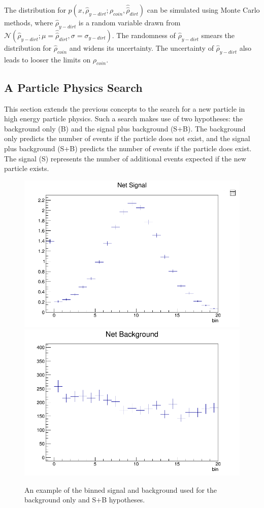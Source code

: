 \documentclass[12pt]{article}
\begin{document}
The distribution for $p(x, \hat{\rho}_{y-dirt}; \rho_{coin}, \hat{\hat{\rho}}_{dirt})$ can be simulated using Monte Carlo methods, where $\hat{\rho}_{y-dirt}$ is a random variable drawn from $\mathcal{N}(\hat{\rho}_{y-dirt}; \mu=\hat{\hat{\rho}}_{dirt}, \sigma=\sigma_{y-dirt})$. The randomness of $\hat{\rho}_{y-dirt}$ smears the distribution for $\hat{\rho}_{coin}$ and widens its uncertainty. The uncertainty of $\hat{\rho}_{y-dirt}$ also leads to looser the limits on $\rho_{coin}$.

\subsection{A Particle Physics Search}

This section extends the previous concepts to the search for a new particle in high energy particle physics. Such a search makes use of two hypotheses: the background only (B) and the signal plus background (S+B). The background only predicts the number of events if the particle does not exist, and the signal plus background (S+B) predicts the number of events if the particle does exist. The signal (S) represents the number of additional events expected if the new particle exists.

\begin{figure}[h!]
  \centering
  \includegraphics[width=0.49\linewidth]{images/binning_signal_example.png}
  \includegraphics[width=0.49\linewidth]{images/binning_bg_example.png}
  \caption[An example of the signal and background used for the background only and S+B hypotheses.]
  {An example of the binned signal and background used for the background only and S+B hypotheses.}
  \label{fig:sb_binning_example}
\end{figure}
\end{document}
